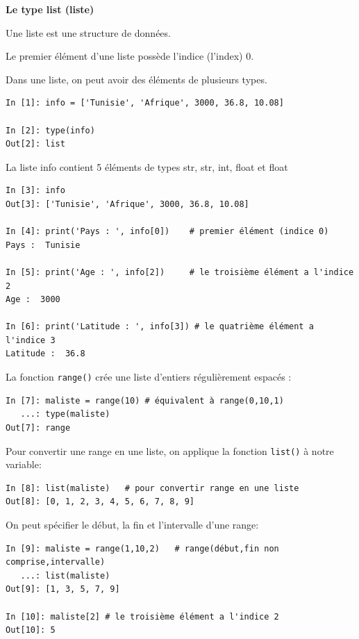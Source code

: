 \documentclass{beamer}
\begin{document}
\begin{frame}

\noindent\textbf{Le type list (liste)}

Une liste est une structure de données.

Le premier élément d'une liste possède l'indice (l'index) 0.

Dans une liste, on peut avoir des éléments de plusieurs types.

\begin{verbatim}
In [1]: info = ['Tunisie', 'Afrique', 3000, 36.8, 10.08]

In [2]: type(info)
Out[2]: list
\end{verbatim}
La liste info contient 5 éléments de types str, str, int, float et float

\begin{verbatim}
In [3]: info
Out[3]: ['Tunisie', 'Afrique', 3000, 36.8, 10.08]

In [4]: print('Pays : ', info[0])    # premier élément (indice 0)
Pays :  Tunisie

In [5]: print('Age : ', info[2])     # le troisième élément a l'indice 2
Age :  3000

In [6]: print('Latitude : ', info[3]) # le quatrième élément a l'indice 3
Latitude :  36.8
\end{verbatim}
\end{frame}

\begin{frame}

La fonction \texttt{range()} crée une liste d'entiers régulièrement espacés :

\begin{verbatim}
In [7]: maliste = range(10) # équivalent à range(0,10,1)
   ...: type(maliste)
Out[7]: range
\end{verbatim}
Pour convertir une range en une liste, on applique la fonction \texttt{list()} à notre variable:
\begin{verbatim}
In [8]: list(maliste)   # pour convertir range en une liste
Out[8]: [0, 1, 2, 3, 4, 5, 6, 7, 8, 9]
\end{verbatim}
On peut spécifier le début, la fin et l'intervalle d'une range:
\begin{verbatim}
In [9]: maliste = range(1,10,2)   # range(début,fin non comprise,intervalle)
   ...: list(maliste)
Out[9]: [1, 3, 5, 7, 9]

In [10]: maliste[2] # le troisième élément a l'indice 2
Out[10]: 5
\end{verbatim}
\end{frame}
\end{document}
